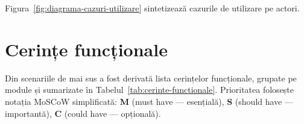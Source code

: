 Figura~\ref{fig:diagrama-cazuri-utilizare} sintetizează cazurile de utilizare pe actori.


\section{Cerințe funcționale}

Din scenariile de mai sus a fost derivată lista cerințelor funcționale, grupate pe module și sumarizate în Tabelul~\ref{tab:cerinte-functionale}. Prioritatea folosește notația MoSCoW simplificată: \textbf{M} (must have --- esențială), \textbf{S} (should have --- importantă), \textbf{C} (could have --- opțională).

